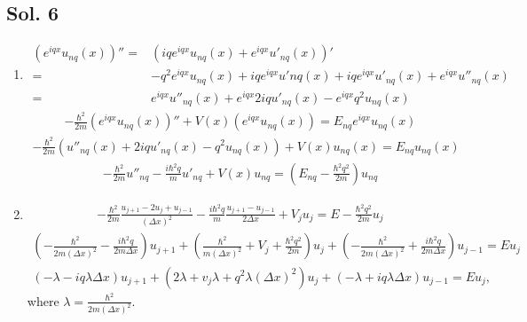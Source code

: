 \subsection*{Sol. 6}
\begin{enumerate}
    \item 
    \begin{align*}
        (e^{iqx}u_{nq}(x))''
        =&
        (iqe^{iqx}u_{nq}(x)+e^{iqx}u'_{nq}(x))'\\
        =&
        -q^2e^{iqx}u_{nq}(x)
        +iqe^{iqx}u'{nq}(x)
        +iqe^{iqx}u'_{nq}(x)
        +e^{iqx}u''_{nq}(x)\\
        =&e^{iqx}u''_{nq}(x)
        +e^{iqx}2iqu'_{nq}(x)
        -e^{iqx}q^2u_{nq}(x)
    \end{align*}
    \begin{align*}
        -\frac{\hbar^2}{2m}(e^{iqx}u_{nq}(x))''
        +V(x)(e^{iqx}u_{nq}(x))
        =E_{nq}e^{iqx}u_{nq}(x)
    \end{align*}
    \begin{align*}
        -\frac{\hbar^2}{2m}
        (u''_{nq}(x)+2iqu'_{nq}(x)-q^2u_{nq}(x))
        +V(x)u_{nq}(x)=E_{nq}u_{nq}(x)
    \end{align*}
    \begin{align*}
        -\frac{\hbar^2}{2m}
        u''_{nq}
        -\frac{i\hbar^2q}{m}
        u'_{nq}
        +V(x)u_{nq}
        =(E_{nq}-\frac{\hbar^2q^2}{2m})u_{nq}
    \end{align*}
    \item 
    \begin{align*}
        -\frac{\hbar^2}{2m}
        \frac{u_{j+1}-2u_j+u_{j-1}}{(\Delta x)^2}
        -\frac{i\hbar^2q}{m}
        \frac{u_{j+1}-u_{j-1}}{2\Delta x}
        +V_ju_j = 
        E-\frac{\hbar^2q^2}{2m}u_j
    \end{align*}
    \begin{align*}
        \left(-\frac{\hbar^2}{2m(\Delta x)^2}-
        \frac{i\hbar^2 q}{2m\Delta x}
        \right)u_{j+1}
        + 
        \left(\frac{\hbar^2}{m(\Delta x)^2}
        +V_j+\frac{\hbar^2q^2}{2m}\right)
        u_j + 
        \left(
        -\frac{\hbar^2}{2m(\Delta x)^2}
        +\frac{i\hbar^2 q}{2m\Delta x}
        \right)u_{j-1} = Eu_j
    \end{align*}
    \begin{align*}
        (-\lambda-iq\lambda\Delta x)u_{j+1}
        +(2\lambda+v_j\lambda+q^2\lambda(\Delta x)^2)u_j
        +
        (-\lambda+iq\lambda\Delta x)u_{j-1}
        =Eu_j,
    \end{align*}
    where $\lambda=\frac{\hbar^2}{2m(\Delta x)^2}.$ 


\end{enumerate}
